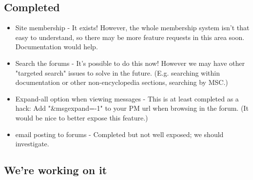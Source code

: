 
\subsection*{Completed}

\begin{itemize}
\item Site membership - It exists! However, the whole membership system isn't that easy to understand, so there may be more feature requests in this area soon. Documentation would help. 

\item Search the forums - It's possible to do this now! However we may have other "targeted search" issues to solve in the future. (E.g. searching within documentation or other non-encyclopedia sections, searching by MSC.) 

\item Expand-all option when viewing messages - This is at least completed as a hack: Add "\&msgexpand=-1" to your PM url when browsing in the forum. (It would be nice to better expose this feature.) 

\item email posting to forums - Completed but not well exposed; we should investigate. 
\end{itemize}

\subsection*{We're working on it}

